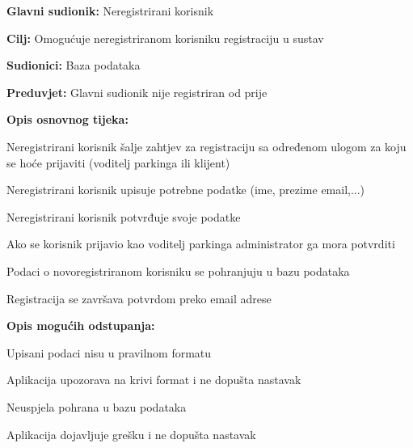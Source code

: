    			\begin{packed_item}
    				
    				\item \textbf{Glavni sudionik:} Neregistrirani korisnik 
    				\item  \textbf{Cilj:} Omogućuje neregistriranom korisniku registraciju u sustav
    				\item  \textbf{Sudionici:} Baza podataka
    				\item  \textbf{Preduvjet:} Glavni sudionik nije registriran od prije
    				\item  \textbf{Opis osnovnog tijeka:}
    				
    				\item[] \begin{packed_enum}
    					
    					\item Neregistrirani korisnik šalje zahtjev za registraciju sa određenom ulogom za koju se hoće prijaviti (voditelj parkinga ili klijent)
    					\item Neregistrirani korisnik upisuje potrebne podatke (ime, prezime email,...)
    					\item Neregistrirani korisnik potvrđuje svoje podatke
    					\item Ako se korisnik prijavio kao voditelj parkinga administrator ga mora potvrditi
    					\item Podaci o novoregistriranom korisniku se pohranjuju u bazu podataka
    					\item Registracija se završava potvrdom preko email adrese
    				\end{packed_enum}
    				
    				\item  \textbf{Opis mogućih odstupanja:}
    				
    				\item[] \begin{packed_item}
    					
    					\item[2.a] Upisani podaci nisu u pravilnom formatu
    					\item[] \begin{packed_enum}
    						
    						\item Aplikacija upozorava na krivi format i ne dopušta nastavak
    						
    					\end{packed_enum}
    					\item[5.a] Neuspjela pohrana u bazu podataka
    					\item[] \begin{packed_enum}
    						
    						\item Aplikacija dojavljuje grešku i ne dopušta nastavak
    						
    					\end{packed_enum}
    					
    				\end{packed_item}
    			\end{packed_item}
